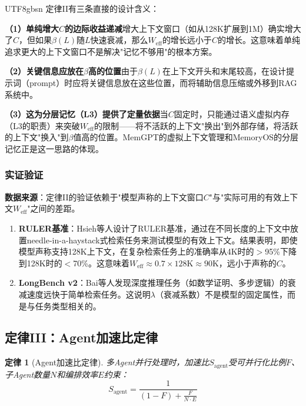 \documentclass[11pt,a4paper]{article}
\newtheorem{law}{定律}[section]
\begin{document}
\begin{CJK*}{UTF8}{gbsn}
定律II有三条直接的设计含义：

\textbf{（1）单纯增大$C$的边际收益递减}增大上下文窗口（如从128K扩展到1M）确实增大了$C$，但如果$\beta(L)$随$L$快速衰减，那么$W_{\mathrm{eff}}$的增长远小于$C$的增长。这意味着单纯追求更大的上下文窗口不是解决"记忆不够用"的根本方案。

\textbf{（2）关键信息应放在$\beta$高的位置}由于$\beta(L)$在上下文开头和末尾较高，在设计提示词（prompt）时应将关键信息放在这些位置，而将辅助信息压缩或外移到RAG系统中。

\textbf{（3）这为分层记忆（L3）提供了定量依据}当$C$固定时，只能通过语义虚拟内存（L3的职责）来突破$W_{\mathrm{eff}}$的限制——将不活跃的上下文"换出"到外部存储，将活跃的上下文"换入"到$\beta$值高的位置。MemGPT的虚拟上下文管理\cite{memgpt2023}和MemoryOS的分层记忆\cite{memoryos2025}正是这一思路的体现。

\subsubsection{实证验证}

\textbf{数据来源}：定律II的验证依赖于"模型声称的上下文窗口$C$"与"实际可用的有效上下文$W_{\mathrm{eff}}$"之间的差距。

\begin{enumerate}[nosep]
\item \textbf{RULER基准}：Hsieh等人设计了RULER基准，通过在不同长度的上下文中放置needle-in-a-haystack式检索任务来测试模型的有效上下文\cite{ruler2024}。结果表明，即使模型声称支持128K上下文，在复杂检索任务上的准确率从4K时的$>$95\%下降到128K时的$<$70\%。这意味着$W_{\mathrm{eff}} \approx 0.7 \times 128\mathrm{K} \approx 90\mathrm{K}$，远小于声称的$C$。

\item \textbf{LongBench v2}：Bai等人发现深度推理任务（如数学证明、多步逻辑）的衰减速度远快于简单检索任务\cite{longbenchv2_2024}。这说明$\lambda$（衰减系数）不是模型的固定属性，而是与任务类型相关的。
\end{enumerate}

\subsection{定律III：Agent加速比定律}
\label{sec:law3}

\begin{law}[Agent加速比定律]
多Agent并行处理时，加速比$S_{\mathrm{agent}}$受可并行化比例$F$、子Agent数量$N$和编排效率$E$约束：
\begin{equation}
\label{eq:agent}
S_{\mathrm{agent}} = \frac{1}{(1-F) + \frac{F}{N \cdot E}}
\end{equation}
\end{law}


\end{CJK*}
\end{document}
